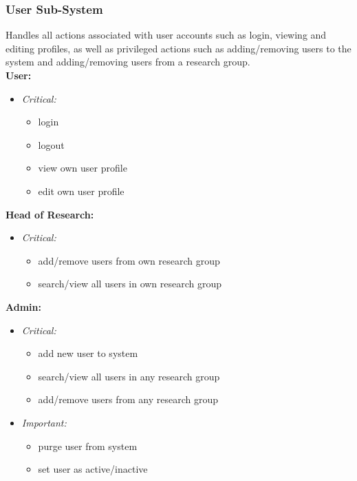 \documentclass{article}
\begin{document}
			\subsubsection{User Sub-System}\label{subsubsec:priority-user}
				Handles all actions associated with user accounts such as login, viewing and editing profiles, as well as privileged actions such as adding/removing users to the system and adding/removing users from a research group.\\
				[3mm]
				\textbf{User:}
				\begin{itemize}
					\item \textit{Critical:}
					\begin{itemize}
						\item login
						\item logout
						\item view own user profile
						\item edit own user profile
					\end{itemize}
				\end{itemize}
				\textbf{Head of Research:}
				\begin{itemize}
					\item \textit{Critical:}
					\begin{itemize}
						\item add/remove users from own research group
						\item search/view all users in own research group
					\end{itemize}
				\end{itemize}
				\textbf{Admin:}
				\begin{itemize}
					\item \textit{Critical:}
					\begin{itemize}
						\item add new user to system
						\item search/view all users in any research group
						\item add/remove users from any research group
					\end{itemize}
					
					\item \textit{Important:}
					\begin{itemize}
						\item purge user from system
						\item set user as active/inactive
					\end{itemize}
				\end{itemize}
\end{document}
